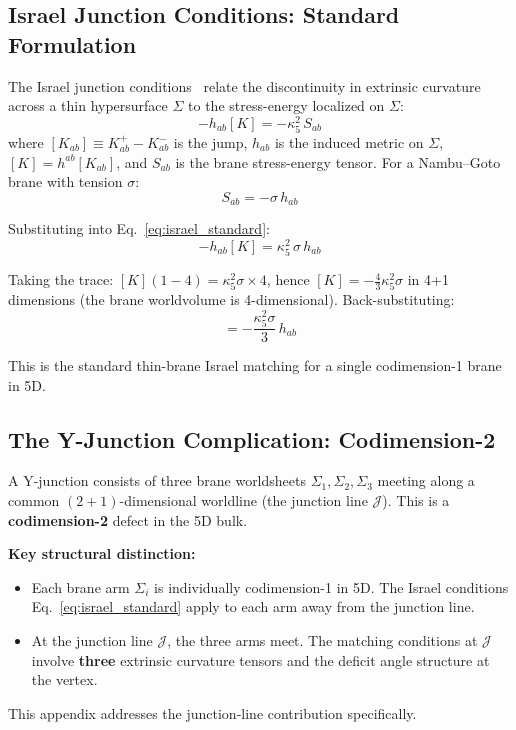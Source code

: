 \subsection{Israel Junction Conditions: Standard Formulation}

The Israel junction conditions \tagDef\ relate the discontinuity in
extrinsic curvature across a thin hypersurface $\Sigma$ to the
stress-energy localized on $\Sigma$:
\begin{equation}
    [K_{ab}] - h_{ab}[K] = -\kappa_5^2\, S_{ab}
    \label{eq:israel_standard}
\end{equation}
where $[K_{ab}] \equiv K_{ab}^+ - K_{ab}^-$ is the jump, $h_{ab}$ is
the induced metric on $\Sigma$, $[K] = h^{ab}[K_{ab}]$, and $S_{ab}$
is the brane stress-energy tensor. For a Nambu--Goto brane with
tension $\sigma$:
\begin{equation}
    S_{ab} = -\sigma\, h_{ab}
    \label{eq:brane_stress_energy}
\end{equation}

Substituting into Eq.~\eqref{eq:israel_standard}:
\begin{equation}
    [K_{ab}] - h_{ab}[K] = \kappa_5^2\, \sigma\, h_{ab}
    \label{eq:israel_NG}
\end{equation}

Taking the trace: $[K](1 - 4) = \kappa_5^2 \sigma \times 4$, hence
$[K] = -\frac{4}{3}\kappa_5^2\sigma$ in 4+1 dimensions
(the brane worldvolume is 4-dimensional). Back-substituting:
\begin{equation}
    [K_{ab}] = -\frac{\kappa_5^2 \sigma}{3}\, h_{ab}
    \label{eq:israel_trace}
\end{equation}

This is the standard thin-brane Israel matching for a single
codimension-1 brane in 5D.

\subsection{The Y-Junction Complication: Codimension-2}

A Y-junction consists of three brane worldsheets $\Sigma_1, \Sigma_2,
\Sigma_3$ meeting along a common $(2+1)$-dimensional worldline
(the junction line $\mathcal{J}$). This is a \textbf{codimension-2}
defect in the 5D bulk.

\begin{assumptionbox}
\textbf{Key structural distinction:}
\begin{itemize}
    \item Each brane arm $\Sigma_i$ is individually codimension-1 in 5D.
          The Israel conditions Eq.~\eqref{eq:israel_standard} apply to
          each arm away from the junction line.
    \item At the junction line $\mathcal{J}$, the three arms meet.
          The matching conditions at $\mathcal{J}$ involve
          \textbf{three} extrinsic curvature tensors and the deficit
          angle structure at the vertex.
\end{itemize}
This appendix addresses the junction-line contribution specifically.
\end{assumptionbox}

